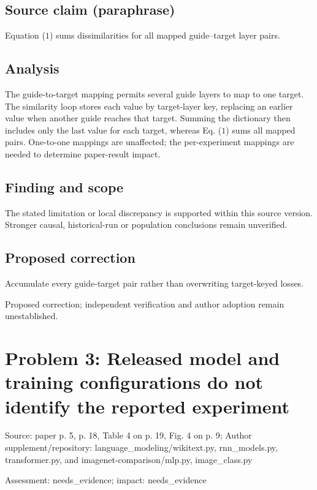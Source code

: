\documentclass[11pt]{article}
\begin{document}
\subsection*{Source claim (paraphrase)}

Equation (\(1\)) sums dissimilarities for all mapped guide--target layer pairs.

\subsection*{Analysis}

The guide-to-target mapping permits several guide layers to map to one target. The similarity loop stores each value by target-layer key, replacing an earlier value when another guide reaches that target. Summing the dictionary then includes only the last value for each target, whereas Eq. (\(1\)) sums all mapped pairs. One-to-one mappings are unaffected; the per-experiment mappings are needed to determine paper-result impact.

\subsection*{Finding and scope}

The stated limitation or local discrepancy is supported within this source version. Stronger causal, historical-run or population conclusions remain unverified.

\subsection*{Proposed correction}

Accumulate every guide-target pair rather than overwriting target-keyed losses.

Proposed correction; independent verification and author adoption remain unestablished.

\section*{Problem 3: Released model and training configurations do not identify the reported experiment}

Source: paper p. 5, p. 18, Table 4 on p. 19, Fig. 4 on p. 9; Author supplement/repository: language\_modeling/wikitext.py, rnn\_models.py, transformer.py, and imagenet-comparison/mlp.py, image\_class.py

Assessment: needs\_evidence; impact: needs\_evidence
\end{document}
